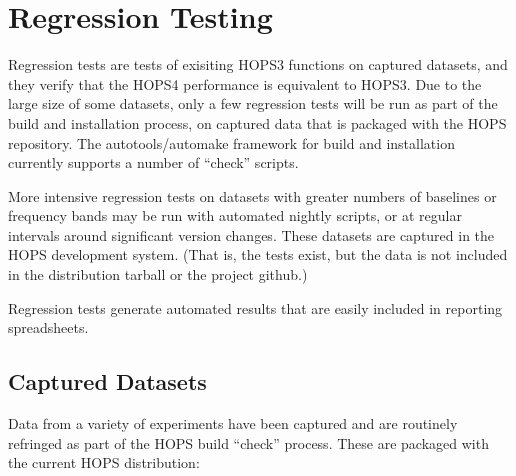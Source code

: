%
\section{Regression Testing}
\label{sec:regress}

Regression tests are tests of exisiting HOPS3 functions on captured datasets, and they verify that the HOPS4 performance is equivalent to HOPS3.  Due to the large size of some datasets, only a few regression tests will be run as part of the build and installation process, on captured data that is packaged with the HOPS repository.  The autotools/automake framework for build and installation currently supports a number of ``check'' scripts.

More intensive regression tests on datasets with greater numbers of baselines or frequency bands may be run with automated nightly scripts, or at regular intervals around significant version changes. These datasets are captured in the \ac{HOPS} development system.  (That is, the tests exist, but the data is not included in the distribution tarball or the project github.)

Regression tests generate automated results that are easily included in reporting spreadsheets.



\subsection{Captured Datasets}
\label{sec:captdatareq}

Data from a variety of experiments have been captured and are routinely refringed as part of the HOPS build ``check'' process.  These are packaged with the current \ac{HOPS} distribution:


